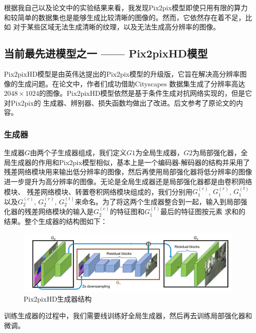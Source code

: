\documentclass[supercite]{HustGraduPaper}
\theoremstyle{definition}
\begin{document}
根据我自己以及论文中的实验结果来看，我发现Pix2pix模型即使只用有限的算力和较简单的数据集也是能够生成比较清晰的图像的。然而，它依然存在着不足，比如
对于某些区域无法生成清晰的纹理，以及无法生成高分辨率的图像。

\subsection{当前最先进模型之一 —— Pix2pixHD模型}

Pix2pixHD模型是由英伟达提出的Pix2pix模型的升级版，它旨在解决高分辨率图像的生成问题。在论文\cite{wang2018pix2pixHD}中，作者们成功借助Cityscapes
数据集\cite{Cordts2016Cityscapes}生成了分辨率高达$2048\times1024$的图像。Pix2pixHD模型依然是基于条件生成对抗网络实现的，但是它对Pix2pix的
生成器、辨别器、损失函数均做出了改进。后文参考了原论文\cite{wang2018pix2pixHD}的内容。

\subsubsection{生成器}

生成器$G$由两个子生成器组成，我们定义$G1$为全局生成器，$G2$为局部强化器，全局生成器的作用和Pix2pix模型相似，基本上是一个编码器-解码器的结构并采用了
残差网络模块用来输出低分辨率的图像，然后再使用局部强化器将低分辨率的图像进一步提升为高分辨率的图像。无论是全局生成器还是局部强化器都是由卷积网络模块、
残差网络模块、转置卷积网络模块组成的，我们分别用$G_{1}^{(c)}$, $G_{1}^{(r)}$, $G_{1}^{(t)}$以及$G_{2}^{(c)}$, $G_{2}^{(r)}$, 
$G_{2}^{(t)}$来命名。为了将这两个生成器整合到一起，输入到局部强化器的残差网络模块的输入是$G_{2}^{(c)}$的特征图和$G_{1}^{(t)}$最后的特征图按元素
求和的结果。整个生成器的结构图如下：
\begin{figure}[H]
  \begin{center}
  \includegraphics[width=12cm]{images/pix2pixHD-generator}
  \end{center}
  \caption{Pix2pixHD生成器结构}
  \label{fig:pix2pixHD-generator}
\end{figure}

训练生成器的过程中，我们需要线训练好全局生成器，然后再去训练局部强化器和微调。
\end{document}

